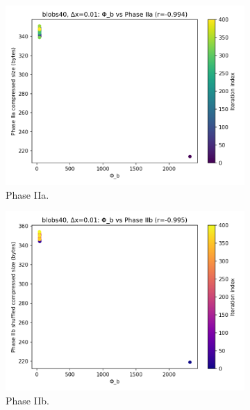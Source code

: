 \documentclass[11pt,a4paper]{article}
\numberwithin{equation}{section}
\begin{document}
\begin{figure}[h!]
\centering
\begin{subfigure}[b]{0.32\textwidth}
\includegraphics[width=\textwidth]{figures/blobs40_dx0.01_phib_vs_phase2a.png}
\caption{Phase IIa.}
\end{subfigure}\hfill
\begin{subfigure}[b]{0.32\textwidth}
\includegraphics[width=\textwidth]{figures/blobs40_dx0.01_phib_vs_phase2b.png}
\caption{Phase IIb.}
\end{subfigure}\hfill
\begin{subfigure}[b]{0.32\textwidth}

\end{subfigure}
\end{figure}
\end{document}
